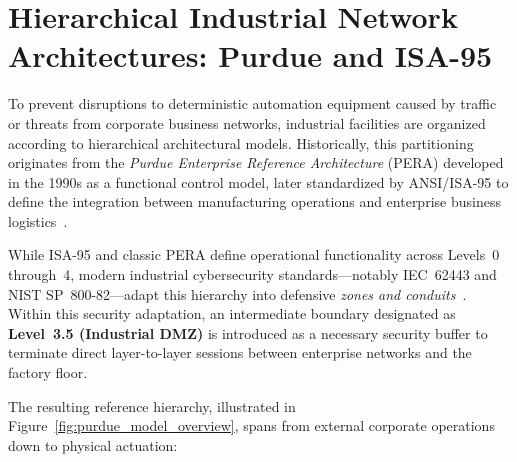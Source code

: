 \documentclass[target=mst,aauheader=aics,style=]{thud}
\begin{document}
\section{Hierarchical Industrial Network Architectures: Purdue and ISA-95}
\label{sec:purdue_model}

To prevent disruptions to deterministic automation equipment caused by traffic or threats from corporate business networks, industrial facilities are organized according to hierarchical architectural models. Historically, this partitioning originates from the \textit{Purdue Enterprise Reference Architecture} (PERA) developed in the 1990s as a functional control model, later standardized by ANSI/ISA-95 to define the integration between manufacturing operations and enterprise business logistics~\cite{isa95}. 

While ISA-95 and classic PERA define operational functionality across Levels~0 through~4, modern industrial cybersecurity standards---notably IEC~62443 and NIST SP~800-82---adapt this hierarchy into defensive \textit{zones and conduits}~\cite{stouffer2023nist}. Within this security adaptation, an intermediate boundary designated as \textbf{Level~3.5 (Industrial DMZ)} is introduced as a necessary security buffer to terminate direct layer-to-layer sessions between enterprise networks and the factory floor. 

The resulting reference hierarchy, illustrated in Figure~\ref{fig:purdue_model_overview}, spans from external corporate operations down to physical actuation:
\end{document}
